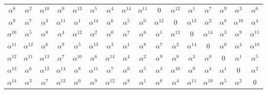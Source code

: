 \documentclass[12pt,a4paper]{article}
\begin{document}
\begin{minipage}{1\textwidth}
\begin{tabular}{c|ccccccccccccccc}
$\alpha^8$    & $\alpha^{2}$ & $\alpha^{10}$ & $\alpha^{0}$ & $\alpha^{13}$ & $\alpha^{5}$ & $\alpha^{4}$ & $\alpha^{14}$ & $\alpha^{11}$ & 0 & $\alpha^{12}$ & $\alpha^{1}$ & $\alpha^{7}$ & $\alpha^{9}$ & $\alpha^{3}$ & $\alpha^{6}$ \\
$\alpha^9$    & $\alpha^{7}$ & $\alpha^{3}$ & $\alpha^{11}$ & $\alpha^{1}$ & $\alpha^{14}$ & $\alpha^{6}$ & $\alpha^{5}$ & $\alpha^{0}$ & $\alpha^{12}$ & 0 & $\alpha^{13}$ & $\alpha^{2}$ & $\alpha^{8}$ & $\alpha^{10}$ & $\alpha^{4}$ \\
$\alpha^{10}$ & $\alpha^{5}$ & $\alpha^{8}$ & $\alpha^{4}$ & $\alpha^{12}$ & $\alpha^{2}$ & $\alpha^{0}$ & $\alpha^{7}$ & $\alpha^{6}$ & $\alpha^{1}$ & $\alpha^{13}$ & 0 & $\alpha^{14}$ & $\alpha^{3}$ & $\alpha^{9}$ & $\alpha^{11}$ \\
$\alpha^{11}$ & $\alpha^{12}$ & $\alpha^{6}$ & $\alpha^{9}$ & $\alpha^{5}$ & $\alpha^{13}$ & $\alpha^{3}$ & $\alpha^{1}$ & $\alpha^{8}$ & $\alpha^{7}$ & $\alpha^{2}$ & $\alpha^{14}$ & 0 & $\alpha^{0}$ & $\alpha^{4}$ & $\alpha^{10}$ \\
$\alpha^{12}$ & $\alpha^{11}$ & $\alpha^{13}$ & $\alpha^{7}$ & $\alpha^{10}$ & $\alpha^{6}$ & $\alpha^{14}$ & $\alpha^{4}$ & $\alpha^{2}$ & $\alpha^{9}$ & $\alpha^{8}$ & $\alpha^{3}$ & $\alpha^{0}$ & 0 & $\alpha^{1}$ & $\alpha^{5}$ \\
$\alpha^{13}$ & $\alpha^{6}$ & $\alpha^{12}$ & $\alpha^{14}$ & $\alpha^{8}$ & $\alpha^{11}$ & $\alpha^{7}$ & $\alpha^{0}$ & $\alpha^{5}$ & $\alpha^{3}$ & $\alpha^{10}$ & $\alpha^{9}$ & $\alpha^{4}$ & $\alpha^{1}$ & 0 & $\alpha^{2}$ \\
$\alpha^{14}$ & $\alpha^{3}$ & $\alpha^{7}$ & $\alpha^{13}$ & $\alpha^{0}$ & $\alpha^{9}$ & $\alpha^{12}$ & $\alpha^{8}$ & $\alpha^{1}$ & $\alpha^{6}$ & $\alpha^{4}$ & $\alpha^{11}$ & $\alpha^{10}$ & $\alpha^{5}$ & $\alpha^{2}$ & 0
\end{tabular}
\end{minipage}
\end{document}
